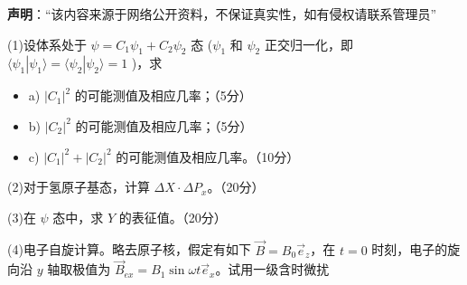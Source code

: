 
\textbf{声明}：“该内容来源于网络公开资料，不保证真实性，如有侵权请联系管理员”

    (1)设体系处于 $\psi = C_1 \psi_1 + C_2 \psi_2$ 态 ($\psi_1$ 和 $\psi_2$ 正交归一化，即 $\langle \psi_1 | \psi_1 \rangle = \langle \psi_2 | \psi_2 \rangle = 1$ )，求
     
    \begin{itemize}
        \item a) $|C_1|^2$ 的可能测值及相应几率；（5分）
        \item b) $|C_2|^2$ 的可能测值及相应几率；（5分）
        \item c) $|C_1|^2 + |C_2|^2$ 的可能测值及相应几率。（10分）
   \end{itemize}
 
    (2)对于氢原子基态，计算 $\Delta X \cdot \Delta P_x$。（20分）

    (3)在 $\psi$ 态中，求 $Y$ 的表征值。（20分）
    
    (4)电子自旋计算。略去原子核，假定有如下 $\vec{B} = B_0 \vec{e}_z$，在 $t=0$ 时刻，电子的旋向沿 $y$ 轴取极值为 $\vec{B}_{ex} = B_1 \sin \omega t \vec{e}_x$。试用一级含时微扰